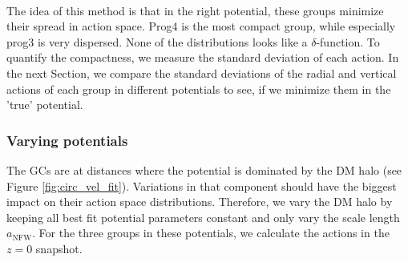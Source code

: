 \\The idea of this method is that in the right potential, these groups minimize their spread in action space. Prog4 is the most compact group, while especially prog3 is very dispersed. None of the distributions looks like a $\delta$-function. To quantify the compactness, we measure the standard deviation of each action. In the next Section, we compare the standard deviations of the radial and vertical actions of each group in different potentials to see, if we minimize them in the 'true' potential.

\subsubsection{Varying potentials}\label{subsubsec:GCs_actions_varying_pot}
The \acp{GC} are at distances where the potential is dominated by the \ac{DM} halo (see Figure \ref{fig:circ_vel_fit}). Variations in that component should have the biggest impact on their action space distributions. Therefore, we vary the \ac{DM} halo by keeping all best fit potential parameters constant and only vary the scale length $a_\mathrm{NFW}$. For the three groups in these potentials, we calculate the actions in the $z=0$ snapshot.
